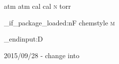 %
%
%
%
%

\RequirePackage{siunitx}

\DeclareSIUnit {\atm       } {atm}
\DeclareSIUnit {\atmosphere} {atm}
\DeclareSIUnit {\calory    } {cal}
\DeclareSIUnit {\cal       } {cal}
\DeclareSIUnit {\moLar     } {\mole\per\liter}
\DeclareSIUnit {\MolMass   } {\gram\per\mole}
\DeclareSIUnit {\normal    } {\textsc{n}}
\DeclareSIUnit {\torr      } {torr}

\AtEndPreamble
  {
    \chemmacros_if_package_loaded:nF {chemstyle}
      {
        \DeclareSIUnit {\cmc  } {\cubic\centi\metre}
        \DeclareSIUnit {\molar} {\mole\per\cubic\deci\metre}
        \DeclareSIUnit {\Molar} {\textsc{m}}
      }
  }

\tex_endinput:D

2015/09/28 - change \AtBeginDocument into \AtEndPreamble

